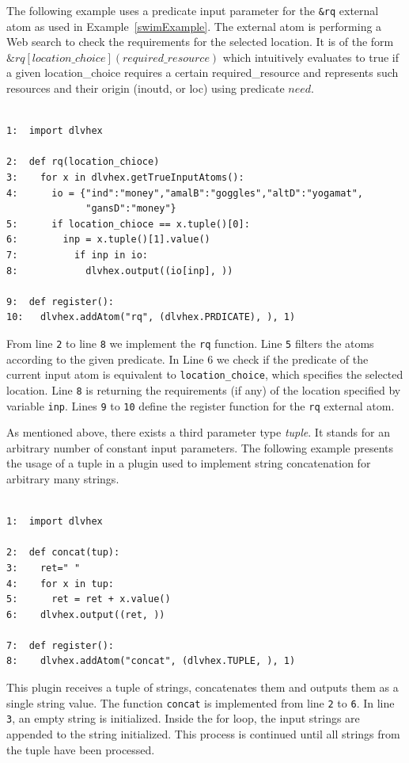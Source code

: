 \documentclass[a4paper, titlepage]{article}
\newcommand{\ext}[3]{\ensuremath{\&{#1}[#2](#3)}}
\begin{document}
The following example uses a predicate input parameter 
for the \verb+&rq+ external atom as used in Example~\ref{swimExample}. The external atom is performing 
a Web search to check the requirements for the selected location. It is of the form 
$\ext{\mathit{rq}}{\mathit{location\_choice}}
{\mathit{required\_resource}}$ which intuitively evaluates 
to true if a given location\_choice requires a certain 
required\_resource and represents such resources and their 
origin (inoutd, or loc) using predicate $\mathit{need}$. 
\begin{exmp}
\label{predicateAsInput}
\begin{verbatim}

1:  import dlvhex 

2:  def rq(location_chioce)
3:    for x in dlvhex.getTrueInputAtoms():
4:      io = {"ind":"money","amalB":"goggles","altD":"yogamat",
              "gansD":"money"}
5:      if location_chioce == x.tuple()[0]:
6:        inp = x.tuple()[1].value()
7:          if inp in io:
8:            dlvhex.output((io[inp], ))

9:  def register():
10:   dlvhex.addAtom("rq", (dlvhex.PRDICATE), ), 1)
\end{verbatim}
\end{exmp}

From line \verb+2+ to line \verb+8+ we implement the \verb+rq+ function. Line \verb+5+ filters the atoms according to the given predicate. In Line 6 we check if the predicate of the current input atom is equivalent to \texttt{location\_choice}, which specifies the selected location. Line \verb+8+ is returning  
the requirements (if any) of the location specified by variable 
\verb+inp+. Lines \verb+9+ to \verb+10+ define the register 
function for the \verb+rq+ external atom.

As mentioned above, there exists a third parameter type \emph{tuple}. It stands for an arbitrary number of constant input parameters. The following example presents the usage of a tuple in a plugin used to implement string concatenation for arbitrary many strings.  
\begin{exmp}
\label{tupleAsInput}
\begin{verbatim}

1:  import dlvhex

2:  def concat(tup):
3:    ret=" "
4:    for x in tup:
5:      ret = ret + x.value()
6:    dlvhex.output((ret, ))

7:  def register():
8:    dlvhex.addAtom("concat", (dlvhex.TUPLE, ), 1)
\end{verbatim}
\end{exmp}
This plugin receives a tuple of strings, concatenates 
them and outputs them as a single string value. The function \verb+concat+ is implemented from line \verb+2+ to \verb+6+. In line \verb+3+, an 
empty string is initialized. Inside the for loop, the input 
strings are appended to the string initialized. This process 
is continued until all strings from the tuple have been processed.  
 
\end{document}
